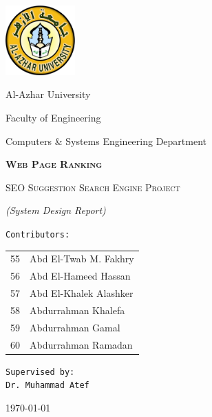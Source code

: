 \documentclass{scrartcl}
\begin{document}
\begin{titlepage}
	\centering
	\includegraphics[width=0.2\textwidth]{al-azhar.png}\par\vspace{12pt}
	{\LARGE Al-Azhar University \par}\vspace{3pt}
	{\Large Faculty of Engineering \par}
	{\Large Computers \& Systems Engineering Department \par}\vspace{12pt}
	\vfill
	{\huge\bfseries\scshape Web Page Ranking \par}\vspace{8pt}
  {\scshape SEO Suggestion Search Engine Project \par}\vspace{8pt}
  {\itshape (System Design Report) \par}
	\vfill
	{\Large\texttt{Contributors:} \\[12pt]
    \Large\itshape\ttfamily
    \begin{tabular}{ll}
      55 & Abd El-Twab M. Fakhry \\
      56 & Abd El-Hameed Hassan \\
      57 & Abd El-Khalek Alashker \\
      58 & Abdurrahman Khalefa \\
      59 & Abdurrahman Gamal \\
      60 & Abdurrahman Ramadan \\
    \end{tabular}
  }\par
	\vspace{1cm}
	\vfill
  {\Large\texttt{Supervised by:} \\
	\texttt{Dr. Muhammad Atef} \par}
  \vfill
  {\large \today \par}
\end{titlepage}

\newpage

\tableofcontents

\newpage
\end{document}
